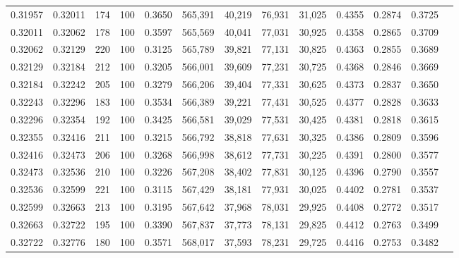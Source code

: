 \begin{tabular}{rrrrrrrrrrrrr}
0.31957 & 0.32011 &   174 & 100 &                                     0.3650 & 565,391 &  40,219 &  76,931 &  31,025 & 0.4355 & 0.2874 & 0.3725 \\
0.32011 & 0.32062 &   178 & 100 &                                     0.3597 & 565,569 &  40,041 &  77,031 &  30,925 & 0.4358 & 0.2865 & 0.3709 \\
0.32062 & 0.32129 &   220 & 100 &                                     0.3125 & 565,789 &  39,821 &  77,131 &  30,825 & 0.4363 & 0.2855 & 0.3689 \\
0.32129 & 0.32184 &   212 & 100 &                                     0.3205 & 566,001 &  39,609 &  77,231 &  30,725 & 0.4368 & 0.2846 & 0.3669 \\
0.32184 & 0.32242 &   205 & 100 &                                     0.3279 & 566,206 &  39,404 &  77,331 &  30,625 & 0.4373 & 0.2837 & 0.3650 \\
0.32243 & 0.32296 &   183 & 100 &                                     0.3534 & 566,389 &  39,221 &  77,431 &  30,525 & 0.4377 & 0.2828 & 0.3633 \\
0.32296 & 0.32354 &   192 & 100 &                                     0.3425 & 566,581 &  39,029 &  77,531 &  30,425 & 0.4381 & 0.2818 & 0.3615 \\
0.32355 & 0.32416 &   211 & 100 &                                     0.3215 & 566,792 &  38,818 &  77,631 &  30,325 & 0.4386 & 0.2809 & 0.3596 \\
0.32416 & 0.32473 &   206 & 100 &                                     0.3268 & 566,998 &  38,612 &  77,731 &  30,225 & 0.4391 & 0.2800 & 0.3577 \\
0.32473 & 0.32536 &   210 & 100 &                                     0.3226 & 567,208 &  38,402 &  77,831 &  30,125 & 0.4396 & 0.2790 & 0.3557 \\
0.32536 & 0.32599 &   221 & 100 &                                     0.3115 & 567,429 &  38,181 &  77,931 &  30,025 & 0.4402 & 0.2781 & 0.3537 \\
0.32599 & 0.32663 &   213 & 100 &                                     0.3195 & 567,642 &  37,968 &  78,031 &  29,925 & 0.4408 & 0.2772 & 0.3517 \\
0.32663 & 0.32722 &   195 & 100 &                                     0.3390 & 567,837 &  37,773 &  78,131 &  29,825 & 0.4412 & 0.2763 & 0.3499 \\
0.32722 & 0.32776 &   180 & 100 &                                     0.3571 & 568,017 &  37,593 &  78,231 &  29,725 & 0.4416 & 0.2753 & 0.3482 \\

\end{tabular}
